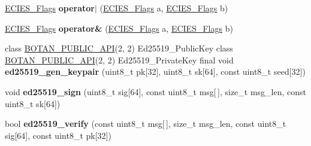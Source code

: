 \begin{DoxyCompactItemize}
\hyperlink{namespace_botan_a9633493dccb5f879eeafafe99c71f6e8}{E\+C\+I\+E\+S\+\_\+\+Flags} {\bfseries operator$\vert$} (\hyperlink{namespace_botan_a9633493dccb5f879eeafafe99c71f6e8}{E\+C\+I\+E\+S\+\_\+\+Flags} a, \hyperlink{namespace_botan_a9633493dccb5f879eeafafe99c71f6e8}{E\+C\+I\+E\+S\+\_\+\+Flags} b)
\item 
\mbox{\label{namespace_botan_a13be8f6b6160759047c0549b85055d43}} 
\hyperlink{namespace_botan_a9633493dccb5f879eeafafe99c71f6e8}{E\+C\+I\+E\+S\+\_\+\+Flags} {\bfseries operator\&} (\hyperlink{namespace_botan_a9633493dccb5f879eeafafe99c71f6e8}{E\+C\+I\+E\+S\+\_\+\+Flags} a, \hyperlink{namespace_botan_a9633493dccb5f879eeafafe99c71f6e8}{E\+C\+I\+E\+S\+\_\+\+Flags} b)
\item 
\mbox{\label{namespace_botan_a06c04ff64a486db50cc6e3b72fd6329a}} 
class \hyperlink{namespace_botan_a6b9388030d872e586a4655b776ac9501}{B\+O\+T\+A\+N\+\_\+\+P\+U\+B\+L\+I\+C\+\_\+\+A\+PI}(2, 2) Ed25519\+\_\+\+Public\+Key class \hyperlink{namespace_botan_a6b9388030d872e586a4655b776ac9501}{B\+O\+T\+A\+N\+\_\+\+P\+U\+B\+L\+I\+C\+\_\+\+A\+PI}(2, 2) Ed25519\+\_\+\+Private\+Key final void {\bfseries ed25519\+\_\+gen\+\_\+keypair} (uint8\+\_\+t pk\mbox{[}32\mbox{]}, uint8\+\_\+t sk\mbox{[}64\mbox{]}, const uint8\+\_\+t seed\mbox{[}32\mbox{]})
\item 
\mbox{\label{namespace_botan_a4f80dc55d276a7421eadfbf91c2bcb69}} 
void {\bfseries ed25519\+\_\+sign} (uint8\+\_\+t sig\mbox{[}64\mbox{]}, const uint8\+\_\+t msg\mbox{[}$\,$\mbox{]}, size\+\_\+t msg\+\_\+len, const uint8\+\_\+t sk\mbox{[}64\mbox{]})
\item 
\mbox{\label{namespace_botan_adfcfbdead133000fa479ef04954bda6d}} 
bool {\bfseries ed25519\+\_\+verify} (const uint8\+\_\+t msg\mbox{[}$\,$\mbox{]}, size\+\_\+t msg\+\_\+len, const uint8\+\_\+t sig\mbox{[}64\mbox{]}, const uint8\+\_\+t pk\mbox{[}32\mbox{]})
\item 

\end{DoxyCompactItemize}
